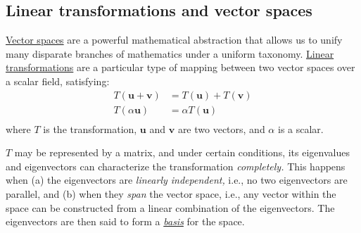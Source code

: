 \documentclass[
  12pt,
  a4paper,
]{article}
\begin{document}
\hypertarget{linear-transformations-and-vector-spaces}{%
\subsection{Linear transformations and vector
spaces}\label{linear-transformations-and-vector-spaces}}

\href{https://en.wikipedia.org/wiki/Vector_space}{Vector spaces} are a
powerful mathematical abstraction that allows us to unify many disparate
branches of mathematics under a uniform taxonomy.
\href{http://mathworld.wolfram.com/LinearTransformation.html}{Linear
transformations} are a particular type of mapping between two vector
spaces over a scalar field, satisfying: \begin{equation}
\begin{aligned}
T(\boldsymbol{u} + \boldsymbol{v}) &= T(\boldsymbol{u}) + T(\boldsymbol{v})\\
T(\alpha\boldsymbol{u}) &= \alpha T(\boldsymbol{u})\\
\end{aligned}
\label{eq:linear}\end{equation} where \(T\) is the transformation,
\(\boldsymbol{u}\) and \(\boldsymbol{v}\) are two vectors, and
\(\alpha\) is a scalar.

\(T\) may be represented by a matrix, and under certain conditions, its
eigenvalues and eigenvectors can characterize the transformation
\emph{completely.} This happens when (a) the eigenvectors are
\emph{linearly independent,} i.e., no two eigenvectors are parallel, and
(b) when they \emph{span} the vector space, i.e., any vector within the
space can be constructed from a linear combination of the eigenvectors.
The eigenvectors are then said to form a
\href{https://en.wikipedia.org/wiki/Basis_\%28linear_algebra\%29}{\emph{basis}}
for the space.
\end{document}
